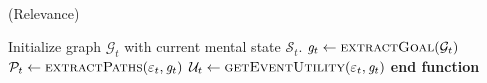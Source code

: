 \documentclass{article}
\begin{document}
\newcommand{\And}{\textit{\textbf{\footnotesize{ AND }}}}
\newcommand{\Or}{\textit{\textbf{\footnotesize{ OR }}}}
\renewcommand{\algorithmicforall}{\textbf{for each}}
\newcommand*\rfrac[2]{{}^{#1}\!/_{#2}}
\newcommand{\mathlowercal}[1]{\textit{\scriptsize{#1}}}

\\

\begin{algorithm}
	\caption{(Relevance)}
	\label{array-sum}
	\begin{algorithmic}[1]
			\Statex
			\State Initialize graph $\mathcal{G}_{t}$ with current mental state
			$\mathcal{S}_{t}$.
			\Statex
			\State $\mathit{g}_{t} \gets \Call{extractGoal}{\mathcal{G}_{t}}$
			\Statex
			\State $\mathcal{P}_{t} \gets \Call{extractPaths}{\varepsilon_t,
			\mathit{g}_{t}}$
			\Statex
				\State {}
			\Else
				\State $\mathcal{U}_{t} \gets \Call{getEventUtility}{\varepsilon_t,
				\mathit{g}_{t}}$ 
				\State {}
				\Else
					\State {}
				\EndIf
			\EndIf
		\EndFunction
		\State \textbf{end function}
	\end{algorithmic}
\end{algorithm}
\end{document}
